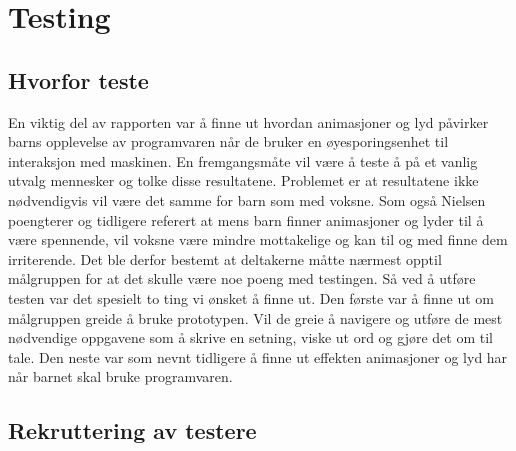  
 
\chapter{Testing} 
 
 
 
\section{Hvorfor teste} 
 
 
En viktig del av rapporten var å finne ut hvordan animasjoner og lyd påvirker barns opplevelse av programvaren når de bruker en øyesporingsenhet til interaksjon med maskinen. En fremgangsmåte vil være å teste å på et vanlig utvalg mennesker og tolke disse resultatene. Problemet er at resultatene ikke nødvendigvis vil være det samme for barn som med voksne. Som også Nielsen poengterer og tidligere referert at mens barn finner animasjoner og lyder til å være spennende, vil voksne være mindre mottakelige og kan til og med finne dem irriterende. Det ble derfor bestemt at deltakerne måtte nærmest opptil målgruppen for at det skulle være noe poeng med testingen. Så ved å utføre testen var det spesielt to ting vi ønsket å finne ut. Den første var å finne ut om målgruppen greide å bruke prototypen. Vil de greie å navigere og utføre de mest nødvendige oppgavene som å skrive en setning, viske ut ord og gjøre det om til tale. Den neste var som nevnt tidligere å finne ut effekten animasjoner og lyd har når barnet skal bruke programvaren.  
 
 
 
\section{Rekruttering av testere} 
 
